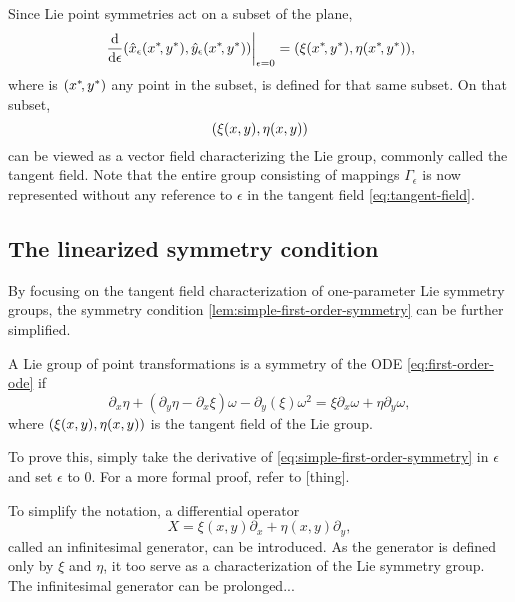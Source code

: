 Since Lie point symmetries act on a subset of the plane,
\begin{equation}
  \eval{\dv{\epsilon} \pqty{\hat{x}_\epsilon(x^*\!,y^*), \hat{y}_\epsilon(x^*\!,y^*)}}_{\epsilon=0} = \pqty{\xi(x^*\!,y^*), \eta(x^*\!,y^*)},
\end{equation}
where is \(\pqty{x^*\!,y^*}\) any point in the subset, is defined for that same subset. %
On that subset,
\begin{equation} \label{eq:tangent-field}
  \pqty{\xi(x,y), \eta(x,y)}
\end{equation}
can be viewed as a vector field characterizing the Lie group, commonly called the tangent field.
Note that the entire group consisting of mappings \(\Gamma_\epsilon\) is now represented without any reference to \(\epsilon\) in the tangent field \ref{eq:tangent-field}.

\subsection{The linearized symmetry condition}

By focusing on the tangent field characterization of one-parameter Lie symmetry groups, the symmetry condition \ref{lem:simple-first-order-symmetry} can be further simplified.
\begin{thm} \label{thm:linearized-first-order-symmetry}
  A Lie group of point transformations is a symmetry of the ODE \ref{eq:first-order-ode} if
  \begin{equation}
    \partial_x \eta + (\partial_y \eta - \partial_x \xi) \omega - \partial_y (\xi) \omega^2 =
    \xi \partial_x \omega + \eta \partial_y \omega,
  \end{equation}
  where \(\pqty{\xi(x,y), \eta(x,y)}\) is the tangent field of the Lie group.
\end{thm} %
To prove this, simply take the derivative of \cref{eq:simple-first-order-symmetry} in \(\epsilon\) and set \(\epsilon\) to 0.
For a more formal proof, refer to [thing]. %

To simplify the notation, a differential operator
\begin{equation}
  X = \xi(x,y) \partial_x + \eta(x,y) \partial_y,
\end{equation}
called an infinitesimal generator, can be introduced.
As the generator is defined only by \(\xi\) and \(\eta\), it too serve as a characterization of the Lie symmetry group.
The infinitesimal generator can be prolonged... %
